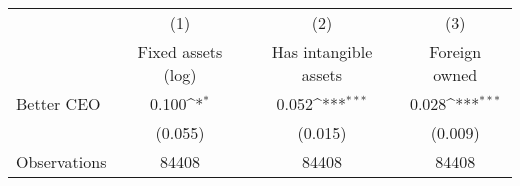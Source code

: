 {
\def\sym#1{\ifmmode^{#1}\else\(^{#1}\)\fi}
\begin{tabular}{l*{3}{c}}
\hline\hline
                    &\multicolumn{1}{c}{(1)}&\multicolumn{1}{c}{(2)}&\multicolumn{1}{c}{(3)}\\
                    &\multicolumn{1}{c}{Fixed assets (log)}&\multicolumn{1}{c}{Has intangible assets}&\multicolumn{1}{c}{Foreign owned}\\
\hline
Better CEO          &       0.100\sym{*}  &       0.052\sym{***}&       0.028\sym{***}\\
                    &     (0.055)         &     (0.015)         &     (0.009)         \\
\hline
Observations        &       84408         &       84408         &       84408         \\
\hline\hline
\end{tabular}
}

